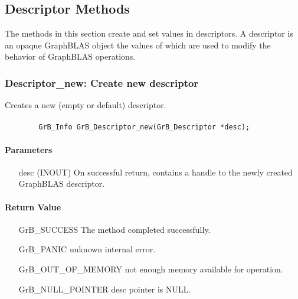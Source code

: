 \subsection{Descriptor Methods}

The methods in this section create and set values in descriptors. 
A descriptor is an opaque GraphBLAS object the values of which are used to
modify the behavior of  GraphBLAS operations.

\subsubsection{{\sf Descriptor\_new}: Create new descriptor}

Creates a new (empty or default) descriptor.

\paragraph{\syntax}

\begin{verbatim}
        GrB_Info GrB_Descriptor_new(GrB_Descriptor *desc);
\end{verbatim}

\paragraph{Parameters}

\begin{itemize}[leftmargin=1.1in]
    \item[{\sf desc}] ({\sf INOUT}) On successful return, contains a 
    handle to the newly created GraphBLAS descriptor.
\end{itemize}

\paragraph{Return Value}

\begin{itemize}[leftmargin=2.1in]
\item[{\sf GrB\_SUCCESS}]  The method completed successfully.
\item[{\sf GrB\_PANIC}]             unknown internal error.
\item[{\sf GrB\_OUT\_OF\_MEMORY}]          not enough memory available for operation.
\item[{\sf GrB\_NULL\_POINTER}]    {\sf desc} pointer is {\sf NULL}.
\end{itemize}

